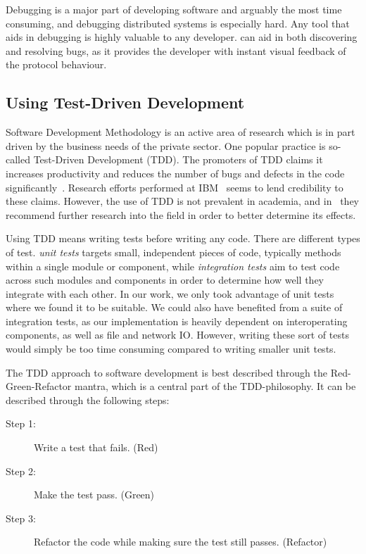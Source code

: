Debugging is a major part of developing software and arguably the most
time consuming, and debugging distributed systems is especially hard.
Any tool that aids in debugging is highly valuable to any developer.
\demo{} can aid in both discovering and resolving bugs, as it provides
the developer with instant visual feedback of the protocol behaviour.

\subsection{Using Test-Driven Development}

Software Development Methodology is an active area of research
which is in part driven by the business needs of the private
sector\cite{janzen2005test}. One popular practice is so-called Test-Driven
Development (TDD). The promoters of TDD claims it increases
productivity and reduces the number of bugs and defects in the
code significantly~\cite{beck2003test}. Research
efforts performed at IBM~\cite{maximilien2003assessing} seems to
lend credibility to these claims. However, the use of TDD is not
prevalent in academia, and in~\cite{janzen2005test} they
recommend further research into the field in order to better
determine its effects.

Using TDD means writing tests before writing any code. There are
different types of test. \emph{unit tests} targets small,
independent pieces of code, typically methods within a single
module or component, while \emph{integration tests} aim to test
code across such modules and components in order to determine
how well they integrate with each other. In our work, we only
took advantage of unit tests where we found it to be suitable.
We could also have benefited from a suite of integration tests,
as our implementation is heavily dependent on interoperating
components, as well as file and network IO\@. However, writing
these sort of tests would simply be too time consuming compared
to writing smaller unit tests.

The TDD approach to software development is best described through the
Red-Green-Refactor mantra, which is a central part of the
TDD-philosophy. It can be described through the following steps:

\begin{description}
    \item[Step 1:] Write a test that fails. (Red)
    \item[Step 2:] Make the test pass. (Green)
    \item[Step 3:] Refactor the code while making sure the test
        still passes. (Refactor)
\end{description}

